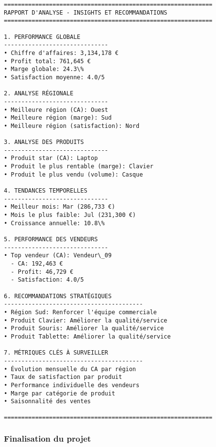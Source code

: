 \documentclass[11pt]{article}
\begin{document}
    \begin{Verbatim}[commandchars=\\\{\}]
============================================================
RAPPORT D'ANALYSE - INSIGHTS ET RECOMMANDATIONS
============================================================

1. PERFORMANCE GLOBALE
------------------------------
• Chiffre d'affaires: 3,134,178 €
• Profit total: 761,645 €
• Marge globale: 24.3\%
• Satisfaction moyenne: 4.0/5

2. ANALYSE RÉGIONALE
------------------------------
• Meilleure région (CA): Ouest
• Meilleure région (marge): Sud
• Meilleure région (satisfaction): Nord

3. ANALYSE DES PRODUITS
------------------------------
• Produit star (CA): Laptop
• Produit le plus rentable (marge): Clavier
• Produit le plus vendu (volume): Casque

4. TENDANCES TEMPORELLES
------------------------------
• Meilleur mois: Mar (286,733 €)
• Mois le plus faible: Jul (231,300 €)
• Croissance annuelle: 10.8\%

5. PERFORMANCE DES VENDEURS
------------------------------
• Top vendeur (CA): Vendeur\_09
  - CA: 192,463 €
  - Profit: 46,729 €
  - Satisfaction: 4.0/5

6. RECOMMANDATIONS STRATÉGIQUES
----------------------------------------
• Région Sud: Renforcer l'équipe commerciale
• Produit Clavier: Améliorer la qualité/service
• Produit Souris: Améliorer la qualité/service
• Produit Tablette: Améliorer la qualité/service

7. MÉTRIQUES CLÉS À SURVEILLER
----------------------------------------
• Évolution mensuelle du CA par région
• Taux de satisfaction par produit
• Performance individuelle des vendeurs
• Marge par catégorie de produit
• Saisonnalité des ventes

============================================================
    \end{Verbatim}

    \subsubsection{Finalisation du projet}\label{finalisation-du-projet}
\end{document}
